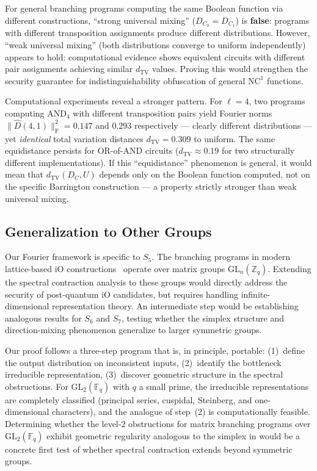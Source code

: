 \documentclass[11pt]{article}
\newcommand{\norm}[1]{\lVert #1 \rVert}
\newcommand{\frob}[1]{\norm{#1}_{\mathrm{F}}}
\newcommand{\dtv}{d_{\mathrm{TV}}}
\newcommand{\Dhat}{\widehat{D}}
\begin{document}
For general branching programs computing the same Boolean function via
different constructions, ``strong universal mixing'' ($D_{C_0} = D_{C_1}$)
is \textbf{false}: programs with different transposition assignments produce
different distributions. However, ``weak universal mixing'' (both distributions
converge to uniform independently) appears to hold: computational evidence shows
equivalent circuits with different pair assignments achieving similar $\dtv$
values. Proving this would strengthen the security guarantee for
indistinguishability obfuscation of general $\mathrm{NC}^1$ functions.

Computational experiments reveal a stronger pattern.  For $\ell = 4$, two
programs computing $\mathrm{AND}_4$ with different transposition pairs
yield Fourier norms $\frob{\Dhat(4,1)}^2 = 0.147$ and $0.293$
respectively --- clearly different distributions --- yet \emph{identical}
total variation distances $\dtv = 0.309$ to uniform.  The same equidistance
persists for OR-of-AND circuits ($\dtv \approx 0.19$ for two structurally
different implementations).  If this ``equidistance'' phenomenon is general,
it would mean that $\dtv(D_C, U)$ depends only on the Boolean function
computed, not on the specific Barrington construction --- a property
strictly stronger than weak universal mixing.


\subsection{Generalization to Other Groups}

Our Fourier framework is specific to $S_5$. The branching programs in modern
lattice-based iO constructions~\cite{BDGM20,WW21,HJL25} operate over matrix
groups $\mathrm{GL}_n(\mathbb{Z}_q)$. Extending the spectral contraction
analysis to these groups would directly address the security of post-quantum
iO candidates, but requires handling infinite-dimensional representation
theory. An intermediate step would be establishing analogous results for
$S_6$ and $S_7$, testing whether the simplex structure and direction-mixing
phenomenon generalize to larger symmetric groups.

Our proof follows a three-step program that is, in principle, portable:
(1)~define the output distribution on inconsistent inputs,
(2)~identify the bottleneck irreducible representation,
(3)~discover geometric structure in the spectral obstructions.
For $\mathrm{GL}_2(\mathbb{F}_q)$ with $q$ a small prime, the irreducible
representations are completely classified (principal series, cuspidal,
Steinberg, and one-dimensional characters), and the analogue of step~(2) is
computationally feasible.  Determining whether the level-$2$ obstructions
for matrix branching programs over $\mathrm{GL}_2(\mathbb{F}_q)$ exhibit
geometric regularity analogous to the simplex in  would
be a concrete first test of whether spectral contraction extends beyond
symmetric groups.
\end{document}
